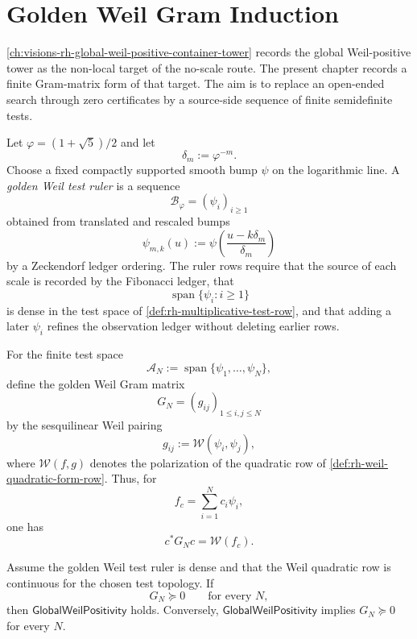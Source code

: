 \chapter{Golden Weil Gram Induction}
\label{ch:visions-rh-golden-weil-gram-induction}

\autoref{ch:visions-rh-global-weil-positive-container-tower} records
the global Weil-positive tower as the non-local target of the no-scale
route.  The present chapter records a finite Gram-matrix form of that
target.  The aim is to replace an open-ended search through zero
certificates by a source-side sequence of finite semidefinite tests.

\begin{definition}
\label{def:rh-golden-weil-test-ruler}
Let $\varphi=(1+\sqrt5)/2$ and let
$$
\delta_m:=\varphi^{-m}.
$$
Choose a fixed compactly supported smooth bump $\psi$ on the logarithmic
line.  A \emph{golden Weil test ruler} is a sequence
$$
\mathcal B_{\varphi}=(\psi_i)_{i\ge1}
$$
obtained from translated and rescaled bumps
$$
\psi_{m,k}(u)
:=
\psi\left(\frac{u-k\delta_m}{\delta_m}\right)
$$
by a Zeckendorf ledger ordering.  The ruler rows require that the
source of each scale is recorded by the Fibonacci ledger, that
$$
\operatorname{span}\{\psi_i:i\ge1\}
$$
is dense in the test space of
\autoref{def:rh-multiplicative-test-row}, and that adding a later
$\psi_i$ refines the observation ledger without deleting earlier rows.
\end{definition}

\begin{definition}
\label{def:rh-golden-weil-gram-matrix}
For the finite test space
$$
\mathcal A_N:=\operatorname{span}\{\psi_1,\ldots,\psi_N\},
$$
define the golden Weil Gram matrix
$$
G_N=(g_{ij})_{1\le i,j\le N}
$$
by the sesquilinear Weil pairing
$$
g_{ij}:=\mathcal W(\psi_i,\psi_j),
$$
where $\mathcal W(f,g)$ denotes the polarization of the quadratic row
of \autoref{def:rh-weil-quadratic-form-row}.  Thus, for
$$
f_c=\sum_{i=1}^N c_i\psi_i,
$$
one has
$$
c^\ast G_Nc=\mathcal W(f_c).
$$
\end{definition}

\begin{theorem}
\label{thm:rh-golden-gram-reduction}
Assume the golden Weil test ruler is dense and that the Weil quadratic
row is continuous for the chosen test topology.  If
$$
G_N\succeq0
\qquad
\text{for every }N,
$$
then $\mathsf{GlobalWeilPositivity}$ holds.  Conversely,
$\mathsf{GlobalWeilPositivity}$ implies $G_N\succeq0$ for every $N$.
\end{theorem}

